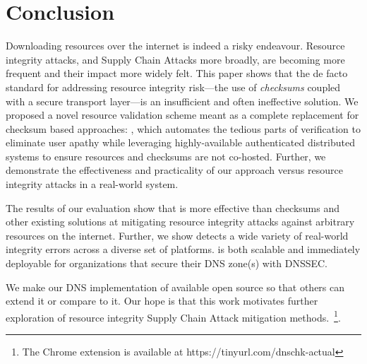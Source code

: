 \section{Conclusion} \label{sec:conclusion}

Downloading resources over the internet is indeed a risky endeavour. Resource
integrity attacks, and Supply Chain Attacks more broadly, are becoming more
frequent and their impact more widely felt. This paper shows that the de facto
standard for addressing resource integrity risk---the use of \emph{checksums}
coupled with a secure transport layer---is an insufficient and often ineffective
solution. We proposed a novel resource validation scheme meant as a complete
replacement for checksum based approaches: \SYSTEM{}, which automates the
tedious parts of verification to eliminate user apathy while leveraging
highly-available authenticated distributed systems to ensure resources and
checksums are not co-hosted. Further, we demonstrate the effectiveness and
practicality of our approach versus resource integrity attacks in a real-world
system.

The results of our evaluation show that \SYSTEM{} is more effective than
checksums and other existing solutions at mitigating resource integrity attacks
against arbitrary resources on the internet. Further, we show \SYSTEM{} detects
a wide variety of real-world integrity errors across a diverse set of platforms.
\SYSTEM{} is both scalable and immediately deployable for organizations that
secure their DNS zone(s) with DNSSEC.

We make our DNS implementation of \SYSTEM{} available open source so that others
can extend it or compare to it. Our hope is that this work motivates further
exploration of resource integrity Supply Chain Attack mitigation
methods.~\footnote{The \SYSTEM{} Chrome extension is available at
https://tinyurl.com/dnschk-actual}.
